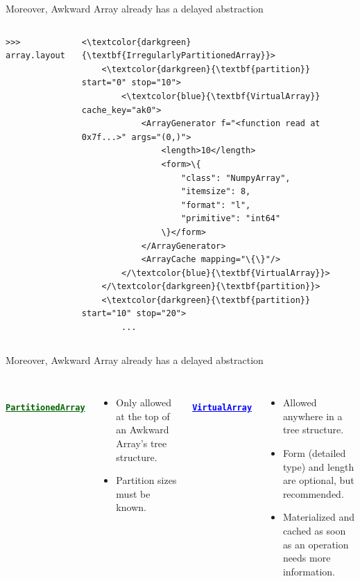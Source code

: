 \documentclass[aspectratio=169]{beamer}
\begin{document}
\begin{frame}[fragile]{Moreover, Awkward Array already has a delayed abstraction}
\small
\begin{columns}
\begin{verbatim}
>>> array.layout
\end{verbatim}
\vspace{-0.4 cm}
\begin{Verbatim}[commandchars=\\\{\}]
<\textcolor{darkgreen}{\textbf{IrregularlyPartitionedArray}}>
    <\textcolor{darkgreen}{\textbf{partition}} start="0" stop="10">
        <\textcolor{blue}{\textbf{VirtualArray}} cache_key="ak0">
            <ArrayGenerator f="<function read at 0x7f...>" args="(0,)">
                <length>10</length>
                <form>\{
                    "class": "NumpyArray",
                    "itemsize": 8,
                    "format": "l",
                    "primitive": "int64"
                \}</form>
            </ArrayGenerator>
            <ArrayCache mapping="\{\}"/>
        </\textcolor{blue}{\textbf{VirtualArray}}>
    </\textcolor{darkgreen}{\textbf{partition}}>
    <\textcolor{darkgreen}{\textbf{partition}} start="10" stop="20">
        ...
\end{Verbatim}
\end{columns}
\end{frame}

\begin{frame}{Moreover, Awkward Array already has a delayed abstraction}
\Large
\vspace{0.25 cm}
\begin{columns}[t]
\mbox{ } \hfill \textcolor{darkgreen}{\underline{\tt\textbf{PartitionedArray}}} \hfill \mbox{ }

\vspace{0.25 cm}
\begin{itemize}
\item Only allowed at the top of an Awkward Array's tree structure.

\item Partition sizes must be known.

\end{itemize}

\mbox{ } \hfill \textcolor{blue}{\underline{\tt\textbf{VirtualArray}}} \hfill \mbox{ }

\vspace{0.25 cm}
\begin{itemize}
\item Allowed anywhere in a tree structure.

\item Form (detailed type) and length are optional, but recommended.

\item Materialized and cached as soon as an operation needs more information.

\end{itemize}

\end{columns}
\end{frame}
\end{document}
